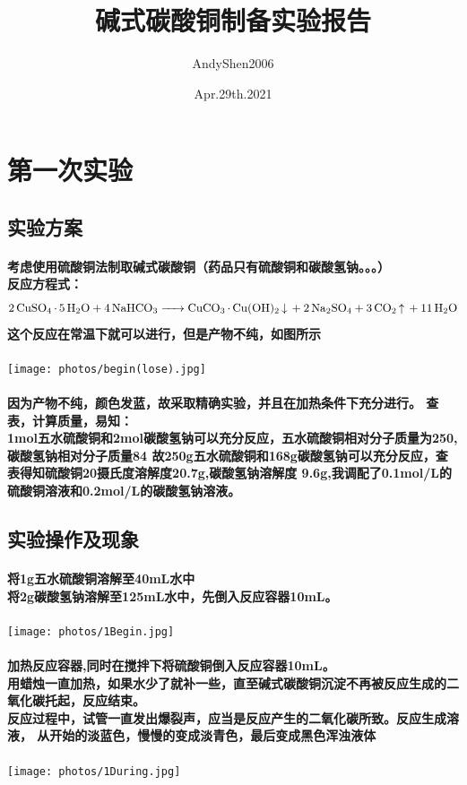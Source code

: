 \documentclass[final,11pt,oneside,UTF8]{report}
\title{碱式碳酸铜制备实验报告}
\author{AndyShen2006}
\date{Apr.29th.2021}
\begin{document}
\maketitle
\section{第一次实验}
\subsection{实验方案}
\paragraph{
    考虑使用硫酸铜法制取碱式碳酸铜（药品只有硫酸铜和碳酸氢钠。。。）\\
    反应方程式：
    $$\ce{2CuSO4 * 5H2O + 4NaHCO3 -> CuCO3 * Cu(OH)2 v + 2Na2SO4 + 3CO2 ^ + 11H2O}$$
    这个反应在常温下就可以进行，但是产物不纯，如图所示
}
\begin{center}
    \texttt{[image: photos/begin(lose).jpg]}
\end{center}
\paragraph{
    因为产物不纯，颜色发蓝，故采取精确实验，并且在加热条件下充分进行。
    查表，计算质量，易知：\\
    1mol五水硫酸铜和2mol碳酸氢钠可以充分反应，五水硫酸铜相对分子质量为250,碳酸氢钠相对分子质量84
    故250g五水硫酸铜和168g碳酸氢钠可以充分反应，查表得知硫酸铜20摄氏度溶解度20.7g,碳酸氢钠溶解度
    9.6g,我调配了0.1mol/L的硫酸铜溶液和0.2mol/L的碳酸氢钠溶液。
}
\subsection{实验操作及现象}
\paragraph{
    将1g五水硫酸铜溶解至40mL水中\\
    将2g碳酸氢钠溶解至125mL水中，先倒入反应容器10mL。\\
}
\begin{center}
    \texttt{[image: photos/1Begin.jpg]}
\end{center}
\paragraph{
    加热反应容器,同时在搅拌下将硫酸铜倒入反应容器10mL。\\
    用蜡烛一直加热，如果水少了就补一些，直至碱式碳酸铜沉淀不再被反应生成的二氧化碳托起，反应结束。\\
    反应过程中，试管一直发出爆裂声，应当是反应产生的二氧化碳所致。反应生成溶液，
    从开始的淡蓝色，慢慢的变成淡青色，最后变成黑色浑浊液体\\
}
\begin{center}
    \texttt{[image: photos/1During.jpg]}
\end{center}
\end{document}

